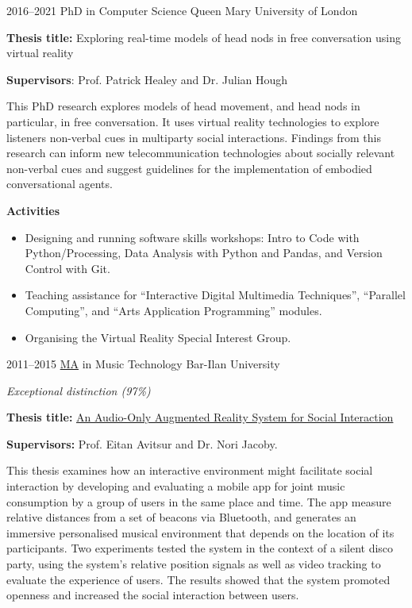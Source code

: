 \documentclass[]{friggeri-cv}
\begin{document}
\begin{entrylist}

  \entry
  {2016--2021}
  {PhD in Computer Science}
  {Queen Mary University of London}
  {
    \textbf{Thesis title:} Exploring real-time models of head nods in free conversation using virtual reality

    \textbf{Supervisors}: Prof. Patrick Healey and Dr. Julian Hough

    This PhD research explores models of head movement, and head nods in particular, in free conversation.
    It uses virtual reality technologies to explore listeners non-verbal cues in multiparty social interactions.
    Findings from this research can inform new telecommunication technologies about socially relevant non-verbal cues and suggest guidelines for the implementation of embodied conversational agents.

    \textbf{Activities}
    \begin{itemize}
      \item
        Designing and running software skills workshops: Intro to Code with Python/Processing, Data Analysis with Python and Pandas, and Version Control with Git.
      \item
        Teaching assistance for ``Interactive Digital Multimedia Techniques'', ``Parallel Computing'', and ``Arts Application Programming'' modules.
      \item
        Organising the Virtual Reality Special Interest Group.
    \end{itemize}
  }

  \entry
  {2011--2015}
  {\href{http://www.tomgurion.me/pdfs/MA.pdf}{MA} in Music Technology}
  {Bar-Ilan University}
  {
    \textit{Exceptional distinction (97\%)}

    \textbf{Thesis title:} \href{http://www.tomgurion.me/pdfs/Gurion - An Audio-Only Augmented Reality System for Social Interaction.pdf}{An Audio-Only Augmented Reality System for Social Interaction}

    \textbf{Supervisors:} Prof. Eitan Avitsur and Dr. Nori Jacoby.

    This thesis examines how an interactive environment might facilitate social interaction by developing and evaluating a mobile app for joint music consumption by a group of users in the same place and time.
    The app measure relative distances from a set of beacons via Bluetooth, and generates an immersive personalised musical environment that depends on the location of its participants.
    Two experiments tested the system in the context of a silent disco party, using the system's relative position signals as well as video tracking to evaluate the experience of users.
    The results showed that the system promoted openness and increased the social interaction between users.

}
\end{entrylist}
\end{document}
